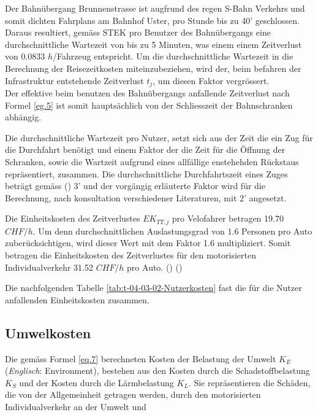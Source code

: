 \begin{IMleftrightskip}
Der Bahnübergang Brunnenstrasse ist augfrund des regen S-Bahn Verkehrs und somit dichten Fahrplans am Bahnhof Uster, pro Stunde bis zu 40' geschlossen. Daraus resultiert, gemäss STEK pro Benutzer des Bahnübergangs eine durchschnittliche Wartezeit von bis zu 5 Minuten, was einem einem Zeitverlust von 0.0833 $h$/Fahrzeug entspricht. Um die durchschnittliche Wartezeit in die Berechnung der Reisezeitkosten miteinzubeziehen, wird der, beim befahren der Infrastruktur entstehende Zeitverlust $t_{j}$, um diesen Faktor vergrössert. \\
Der effektive beim benutzen des Bahnübergangs anfallende Zeitverlust nach Formel \ref{eg.5} ist somit hauptsächlich von der Schliesszeit der Bahnschranken abhängig. 

Die durchschnittliche Wartezeit pro Nutzer, setzt sich aus der Zeit die ein Zug für die Durchfahrt benötigt und einem Faktor der die Zeit für die Öffnung der Schranken, sowie die Wartzeit aufgrund eines allfällige enstehehden Rückstaus repräsentiert, zusammen. Die durchschnittliche Durchfahrtszeit eines Zuges beträgt gemäss (\cite{STEK}) 3' und der vorgängig erläuterte Faktor wird für die Berechnung, nach konsultation verschiedener Literaturen, mit 2' angesetzt.  
\end{IMleftrightskip}

Die Einheitskosten des Zeitverlustes $EK_{TT,j}$ pro Velofahrer betragen 19.70 $CHF/h$. Um denn durchschnittlichen Auslastungsgrad von 1.6 Personen pro Auto  zuberücksichtigen, wird dieser Wert mit dem Faktor 1.6 multipliziert. Somit betragen die Einheitskosten des Zeitverlustes für den motorisierten Individualverkehr 31.52 $CHF/h$ pro Auto. (\cite{Adey2012}) (\cite{Mikrozensus2015})


Die nachfolgenden Tabelle \ref{tab:t-04-03-02-Nutzerkosten} fast die für die Nutzer anfallenden Einheitskosten zusammen.


\newpage


\subsection*{Umwelkosten}
\label{subsec:Environment}


Die gemäss Formel \ref{eq.7} berechneten Kosten der Belastung der Umwelt $K_{E}$ (\textit{Englisch}: Environment), bestehen aus den Kosten durch die Schadstoffbelastung$K_{S}$ und der Kosten durch die Lärmbelastung $K_{L}$. Sie repräsentieren die Schäden, die von der Allgemeinheit getragen werden, durch den motorisierten Individualverkehr an der Umwelt und  

